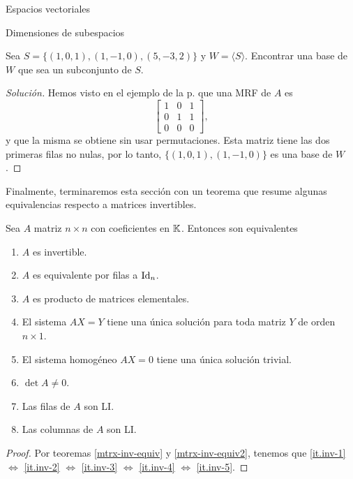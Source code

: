\begin{chapter}{Espacios vectoriales}
\begin{section}{Dimensiones de subespacios}
    \begin{ejemplo*}
        Sea $S = \{(1,0,1),(1,-1,0), (5,-3,2)\}$ y $W = \langle S\rangle$. Encontrar una base de $W$ que sea un subconjunto de $S$. 
    \end{ejemplo*}
    \begin{proof}[Solución] Hemos visto en el ejemplo de la p. \pageref{ej-4.5} que una  MRF de $A$  es 
        \begin{equation*}
            \begin{bmatrix} 1&0&1\\0&1&1\\0&0&0 \end{bmatrix},
        \end{equation*}
        y que la misma se obtiene sin usar permutaciones. Esta matriz tiene las dos primeras filas no nulas, por lo tanto, $\{(1,0,1),(1,-1,0)\}$ es una base de $W$.
    \end{proof}

Finalmente, terminaremos esta sección con un teorema que resume algunas equivalencias respecto a matrices invertibles.

\begin{teorema}
    Sea $A$ matriz $n \times n$ con coeficientes en $\mathbb K$. Entonces son equivalentes
    \begin{enumerate} 
        \item\label{it.inv-1} $A$ es invertible.
        \item\label{it.inv-2} $A$  es equivalente por filas a $\operatorname{Id}_n$.
        \item\label{it.inv-3} $A$ es producto de matrices elementales.
        \item\label{it.inv-4} El sistema $AX=Y$ tiene una única solución para toda matriz $Y$ de orden $n \times 1$. 
        \item\label{it.inv-5} El sistema homogéneo $AX=0$ tiene una única solución trivial.
        \item\label{it.inv-6} $\det A \ne 0$.
        \item\label{it.inv-7} Las filas de $A$ son LI.
        \item\label{it.inv-8} Las columnas de $A$ son LI.
    \end{enumerate}
\end{teorema}
\begin{proof} Por teoremas \ref{mtrx-inv-equiv} y  \ref{mtrx-inv-equiv2}, tenemos que 	\ref{it.inv-1}$\Leftrightarrow$ 	\ref{it.inv-2} $\Leftrightarrow$ 	\ref{it.inv-3} $\Leftrightarrow$ 	\ref{it.inv-4} $\Leftrightarrow$ 	\ref{it.inv-5}.
    

\end{proof}
\end{section}
\end{chapter}
